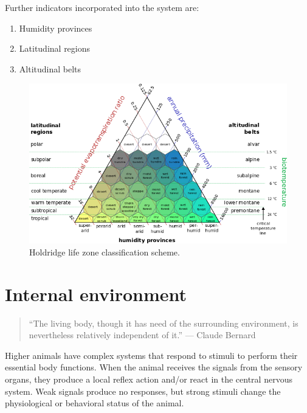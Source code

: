 \documentclass[]{book}
\providecommand{\tightlist}{%
  \setlength{\itemsep}{0pt}\setlength{\parskip}{0pt}}
\begin{document}
Further indicators incorporated into the system are:

\begin{enumerate}
\def\labelenumi{\arabic{enumi}.}
\tightlist
\item
  Humidity provinces
\item
  Latitudinal regions
\item
  Altitudinal belts
\end{enumerate}

\begin{figure}

{\centering \includegraphics[width=1\linewidth]{figures/lifezones} 

}

\caption{Holdridge life zone classification scheme.}\label{fig:holdridge}
\end{figure}

\section{Internal environment}\label{internal-environment}

\begin{quote}
``The living body, though it has need of the surrounding environment, is
nevertheless relatively independent of it.'' --- Claude Bernard
\end{quote}

Higher animals have complex systems that respond to stimuli to perform
their essential body functions. When the animal receives the signals
from the sensory organs, they produce a local reflex action and/or react
in the central nervous system. Weak signals produce no responses, but
strong stimuli change the physiological or behavioral status of the
animal.
\end{document}
